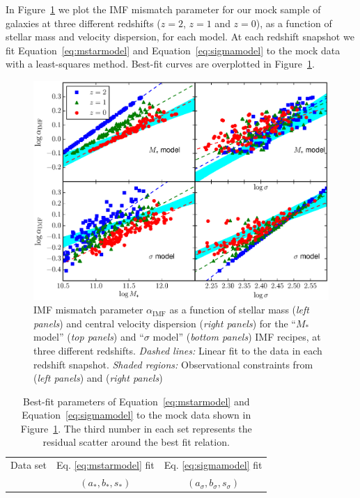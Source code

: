 \documentclass[usenatbib, letters]{mnras}
\def\aimf{\alpha_{\mathrm{IMF}}}
\def\Fref#1{Figure~\ref{#1}\xspace}
\def\Eref#1{Equation~\ref{#1}\xspace}
\begin{document}
In \Fref{fig:snap} we plot the IMF mismatch parameter for our mock sample of galaxies at three different redshifts ($z=2$, $z=1$ and $z=0$), as a function of stellar mass and velocity dispersion, for each model.
At each redshift snapshot we fit \Eref{eq:mstarmodel} and \Eref{eq:sigmamodel} to the mock data with a least-squares method. Best-fit curves are overplotted in \Fref{fig:snap}.
%
\begin{figure}
 \includegraphics[width=\textwidth]{snapshots.eps}
 \caption{ IMF mismatch parameter $\aimf$ as a function of stellar mass ({\em left panels}) and central velocity dispersion ({\em right panels}) for the ``$M_*$ model'' ({\em top panels}) and ``$\sigma$ model'' ({\em bottom panels}) IMF recipes, at three different redshifts.
{\em Dashed lines:} Linear fit to the data in each redshift snapshot.
{\em Shaded regions:} Observational constraints from \citet{Son++15} ({\em left panels}) and \citet{Pos++15} ({\em right panels})
}
 \label{fig:snap}
\end{figure}
%
\begin{table}
 \caption{Best-fit parameters of \Eref{eq:mstarmodel} and \Eref{eq:sigmamodel} to the mock data shown in \Fref{fig:snap}. The third number in each set represents the residual scatter around the best fit relation.}
 \label{tab:oneparfit}
 \begin{tabular}{lcc}
 \hline
 Data set & Eq. \ref{eq:mstarmodel} fit & Eq. \ref{eq:sigmamodel} fit\\
 & $(a_*, b_*, s_*)$ & $(a_\sigma, b_\sigma, s_\sigma)$ \\
 \hline
 
 \hline
 \end{tabular}
\end{table}
\end{document}
